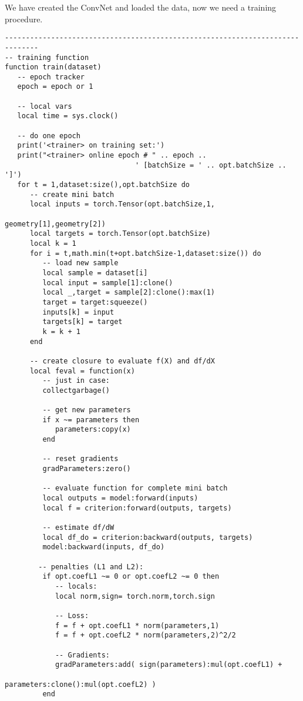 We have created the ConvNet and loaded the data, 
now we need a training procedure.

\begin{verbatim}
------------------------------------------------------------------------------
-- training function
function train(dataset)
   -- epoch tracker
   epoch = epoch or 1

   -- local vars
   local time = sys.clock()

   -- do one epoch
   print('<trainer> on training set:')
   print("<trainer> online epoch # " .. epoch .. 
                               ' [batchSize = ' .. opt.batchSize .. ']')
   for t = 1,dataset:size(),opt.batchSize do
      -- create mini batch
      local inputs = torch.Tensor(opt.batchSize,1,
                                                  geometry[1],geometry[2])
      local targets = torch.Tensor(opt.batchSize)
      local k = 1
      for i = t,math.min(t+opt.batchSize-1,dataset:size()) do
         -- load new sample
         local sample = dataset[i]
         local input = sample[1]:clone()
         local _,target = sample[2]:clone():max(1)
         target = target:squeeze()
         inputs[k] = input
         targets[k] = target
         k = k + 1
      end

      -- create closure to evaluate f(X) and df/dX
      local feval = function(x)
         -- just in case:
         collectgarbage()

         -- get new parameters
         if x ~= parameters then
            parameters:copy(x)
         end

         -- reset gradients
         gradParameters:zero()

         -- evaluate function for complete mini batch
         local outputs = model:forward(inputs)
         local f = criterion:forward(outputs, targets)

         -- estimate df/dW
         local df_do = criterion:backward(outputs, targets)
         model:backward(inputs, df_do)

        -- penalties (L1 and L2):
         if opt.coefL1 ~= 0 or opt.coefL2 ~= 0 then
            -- locals:
            local norm,sign= torch.norm,torch.sign

            -- Loss:
            f = f + opt.coefL1 * norm(parameters,1)
            f = f + opt.coefL2 * norm(parameters,2)^2/2

            -- Gradients:
            gradParameters:add( sign(parameters):mul(opt.coefL1) + 
                                              parameters:clone():mul(opt.coefL2) )
         end


\end{verbatim}
